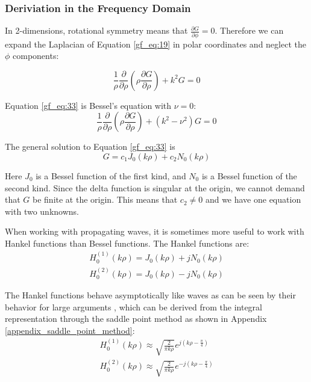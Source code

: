 \subsubsection{Deriviation in the Frequency Domain}
In 2-dimensions,  rotational symmetry means that  $\frac{\partial G}{\partial\phi} =0$. Therefore we can expand the Laplacian of Equation \ref{gf_eq:19} in polar coordinates and neglect the $\phi$ components:

\begin{equation}
\frac{1}{\rho}\frac{\partial}{\partial \rho}\left(\rho\frac{\partial G}{\partial \rho}\right)+ k^2G = 0
\label{gf_eq:33}
\end{equation}
\renewcommand{\baselinestretch}{2} \small\normalsize

\noindent Equation \ref{gf_eq:33} is Bessel's equation with $\nu = 0$:
\begin{equation}
\frac{1}{\rho}\frac{\partial}{\partial \rho}\left(\rho\frac{\partial G}{\partial \rho}\right)+ \left(k^2 -\nu^2\right)G = 0
\label{gf_eq:34}
\end{equation}
\renewcommand{\baselinestretch}{2} \small\normalsize

\noindent The general solution to Equation \ref{gf_eq:33} is 
\begin{equation}
G = c_1J_0\left(k\rho\right) + c_2N_0\left(k\rho\right)
\label{gf_eq:35}
\end{equation}
\renewcommand{\baselinestretch}{2} \small\normalsize

Here $J_0$ is a Bessel function of the first kind, and $N_0$ is a Bessel function of the second kind. Since the delta function is singular at the origin, we cannot demand that $G$ be finite at the origin. This means that $c_2 \neq 0$ and we have one equation with two unknowns.

When working with propagating waves, it is sometimes more useful to work with Hankel functions than Bessel functions. The Hankel functions are:
\begin{equation}
\begin{gathered}
H_0^{(1)}(k\rho) = J_0(k\rho) + jN_0(k\rho) \\
H_0^{(2)}(k\rho) = J_0(k\rho) - jN_0(k\rho)
\label{gf_eq:36}
\end{gathered}
\end{equation}
\renewcommand{\baselinestretch}{2} \small\normalsize

The Hankel functions behave asymptotically like waves as can be seen by their behavior for large arguments \cite{abramowitz_stegun}, which can be derived from the integral representation through the saddle point method as shown in Appendix \ref{appendix_saddle_point_method}:
\begin{equation}
\begin{gathered}
H_0^{(1)}(k\rho) \approx \sqrt{\frac{2}{\pi k\rho}}e^{j\left(k\rho - \frac{\pi}{4}\right)}\\
H_0^{(2)}(k\rho) \approx \sqrt{\frac{2}{\pi k\rho}}e^{-j\left(k\rho - \frac{\pi}{4}\right)}
\label{gf_eq:36a}
\end{gathered}
\end{equation}
\renewcommand{\baselinestretch}{2} \small\normalsize

